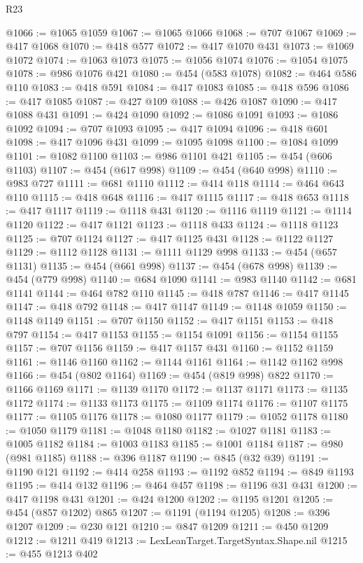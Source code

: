 \begin{lexlean}{R23}
\begin{coremodule}
{{{{{{{{{{{{{{{{{{{{{{{{{{{{{{{{{{{{{{{{{{{{{{{{{{{{{{{{{{{{{{{{{{{{{{{{{{{{{{{{{{{{{{{{{{{{{@1066 := @1065 @1059
@1067 := @1065 @1066
@1068 := @707 @1067
@1069 := @417 @1068
@1070 := @418 @577
@1072 := @417 @1070 @431
@1073 := @1069 @1072
@1074 := @1063 @1073
@1075 := @1056 @1074
@1076 := @1054 @1075
@1078 := @986 @1076 @421
@1080 := @454 (@583 @1078)
@1082 := @464 @586 @110
@1083 := @418 @591
@1084 := @417 @1083
@1085 := @418 @596
@1086 := @417 @1085
@1087 := @427 @109
@1088 := @426 @1087
@1090 := @417 @1088 @431
@1091 := @424 @1090
@1092 := @1086 @1091
@1093 := @1086 @1092
@1094 := @707 @1093
@1095 := @417 @1094
@1096 := @418 @601
@1098 := @417 @1096 @431
@1099 := @1095 @1098
@1100 := @1084 @1099
@1101 := @1082 @1100
@1103 := @986 @1101 @421
@1105 := @454 (@606 @1103)
@1107 := @454 (@617 @998)
@1109 := @454 (@640 @998)
@1110 := @983 @727
@1111 := @681 @1110
@1112 := @414 @118
@1114 := @464 @643 @110
@1115 := @418 @648
@1116 := @417 @1115
@1117 := @418 @653
@1118 := @417 @1117
@1119 := @1118 @431
@1120 := @1116 @1119
@1121 := @1114 @1120
@1122 := @417 @1121
@1123 := @1118 @433
@1124 := @1118 @1123
@1125 := @707 @1124
@1127 := @417 @1125 @431
@1128 := @1122 @1127
@1129 := @1112 @1128
@1131 := @1111 @1129 @998
@1133 := @454 (@657 @1131)
@1135 := @454 (@661 @998)
@1137 := @454 (@678 @998)
@1139 := @454 (@779 @998)
@1140 := @684 @1090
@1141 := @983 @1140
@1142 := @681 @1141
@1144 := @464 @782 @110
@1145 := @418 @787
@1146 := @417 @1145
@1147 := @418 @792
@1148 := @417 @1147
@1149 := @1148 @1059
@1150 := @1148 @1149
@1151 := @707 @1150
@1152 := @417 @1151
@1153 := @418 @797
@1154 := @417 @1153
@1155 := @1154 @1091
@1156 := @1154 @1155
@1157 := @707 @1156
@1159 := @417 @1157 @431
@1160 := @1152 @1159
@1161 := @1146 @1160
@1162 := @1144 @1161
@1164 := @1142 @1162 @998
@1166 := @454 (@802 @1164)
@1169 := @454 (@819 @998) @822
@1170 := @1166 @1169
@1171 := @1139 @1170
@1172 := @1137 @1171
@1173 := @1135 @1172
@1174 := @1133 @1173
@1175 := @1109 @1174
@1176 := @1107 @1175
@1177 := @1105 @1176
@1178 := @1080 @1177
@1179 := @1052 @1178
@1180 := @1050 @1179
@1181 := @1048 @1180
@1182 := @1027 @1181
@1183 := @1005 @1182
@1184 := @1003 @1183
@1185 := @1001 @1184
@1187 := @980 (@981 @1185)
@1188 := @396 @1187
@1190 := @845 (@32 @39)
@1191 := @1190 @121
@1192 := @414 @258
@1193 := @1192 @852
@1194 := @849 @1193
@1195 := @414 @132
@1196 := @464 @457
@1198 := @1196 @31 @431
@1200 := @417 @1198 @431
@1201 := @424 @1200
@1202 := @1195 @1201
@1205 := @454 (@857 @1202) @865
@1207 := @1191 (@1194 @1205)
@1208 := @396 @1207
@1209 := @230 @121
@1210 := @847 @1209
@1211 := @450 @1209
@1212 := @1211 @419
@1213 := LexLeanTarget.TargetSyntax.Shape.nil
@1215 := @455 @1213 @402
}}}}}}}}}}}}}}}}}}}}}}}}}}}}}}}}}}}}}}}}}}}}}}}}}}}}}}}}}}}}}}}}}}}}}}}}}}}}}}}}}}}}}}}}}}}}}
\end{coremodule}
\end{lexlean}
